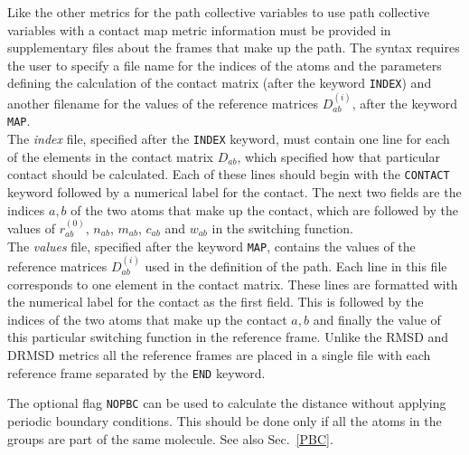 \documentclass[12pt,fleqn]{report}
\newcommand{\keyword}[1]{\index{Keywords!{\tt #1}} {\tt #1}}
\begin{document}
 Like the other metrics for the path collective variables to use path collective variables with a contact map metric
 information must be provided in supplementary files about the frames that make up the path.  
 The syntax requires the user to specify a file name for the indices of the atoms and the parameters defining 
 the calculation of the contact matrix (after the keyword  {\tt INDEX}) and another filename for the values of the 
 reference matrices $D_{ab}^{(i)}$, after the keyword {\tt MAP}.  
 \\
 The {\it index} file, specified after the  {\tt INDEX} keyword, must contain one line for each of the elements in the 
 contact matrix $D_{ab}$, which specified how that particular contact should be calculated.  
   Each of these lines should begin with the {\tt CONTACT} keyword
 followed by a numerical label for the contact.  The next two fields are the indices $a,b$  of
 the two atoms that make up the contact, which are followed by the values of 
 $r_{ab}^{(0)}$, $n_{ab}$, $m_{ab}$, $c_{ab}$ and $w_{ab}$ in the switching function.
\\
The {\it values} file, specified  after the keyword {\tt MAP},
contains the values of the reference matrices $D_{ab}^{(i)}$ used in the definition of the path. 
Each line in this file corresponds to one element in the contact matrix. These lines are formatted 
with the numerical label for the contact as the first field.  This is followed by the indices of the two atoms
that make up the contact $a,b$ and finally the value of this particular switching function in 
the reference frame.  Unlike the RMSD and DRMSD metrics all the reference frames are placed in a single file
with each reference frame separated by the {\tt END} keyword.

The optional flag \keyword{NOPBC} can be used to calculate the distance without applying periodic
boundary conditions. This should be done only if all the atoms in the groups are part of the same molecule. See also
Sec.~\ref{PBC}.

\end{document}
